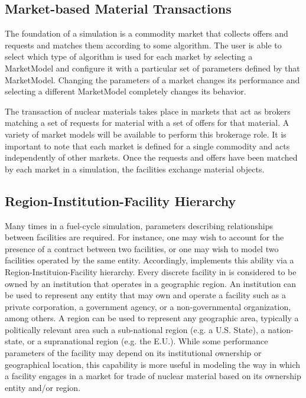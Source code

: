 \subsection{Market-based Material Transactions}

The foundation of a simulation is a commodity market that collects 
offers and requests and matches them according to some algorithm.  The 
user is able to select which type of algorithm is used for each market 
by selecting a MarketModel and configure it with a particular set of 
parameters defined by that MarketModel.  Changing the parameters of a 
market changes its performance and selecting a different MarketModel 
completely changes its behavior.

The transaction of nuclear materials takes place in markets that act
as brokers matching a set of requests for material with a set of
offers for that material. A variety of market models will be available
to perform this brokerage role. It is important to note that each
market is defined for a single commodity and acts independently of
other markets. Once the requests and offers have been matched by each
market in a simulation, the facilities exchange material objects.

\subsection{Region-Institution-Facility Hierarchy}

Many times in a fuel-cycle simulation, parameters describing
relationships between facilities are required. For instance, one may
wish to account for the presence of a contract between two facilities,
or one may wish to model two facilities operated by the same
entity. Accordingly, \Cyclus implements this ability via a
Region-Instituion-Facility hierarchy. Every discrete facility in
\Cyclus is considered to be owned by an institution that operates in a
geographic region.  An institution can be used to represent any entity
that may own and operate a facility such as a private corporation, a
government agency, or a non-governmental organization, among others.
A region can be used to represent any geographic area, typically a
politically relevant area such a sub-national region (e.g. a
U.S. State), a nation-state, or a supranational
region (e.g. the E.U.).  While some performance parameters of the
facility may depend on its institutional ownership or geographical
location, this capability is more useful in modeling the way in which
a facility engages in a market for trade of nuclear material based on
its ownership entity and/or region.

